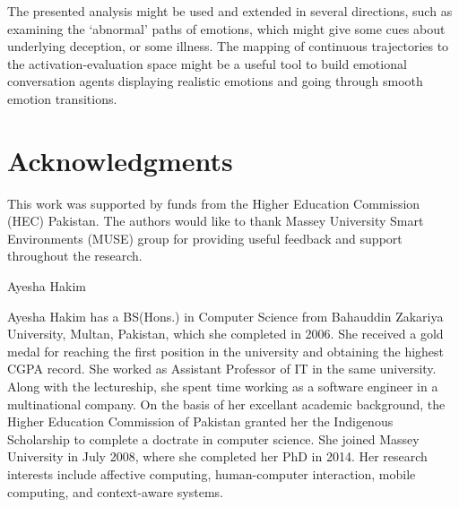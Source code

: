 \documentclass[10pt,journal,cspaper,compsoc]{IEEEtran}
\begin{document}
The presented analysis might be used and extended in several directions, such as examining the `abnormal' paths of emotions, which might give some cues about underlying deception, or some illness. The mapping of continuous trajectories to the activation-evaluation space might be a useful tool to build emotional conversation agents displaying realistic emotions and going through smooth emotion transitions.


\section*{Acknowledgments}
This work was supported by funds from the Higher Education Commission (HEC) Pakistan. The authors would like to thank Massey University Smart Environments (MUSE) group for providing useful feedback and support throughout the research.


\ifCLASSOPTIONcaptionsoff
  \newpage
\fi




 

\begin{biography}{Ayesha Hakim}

Ayesha Hakim has a BS(Hons.) in Computer Science from Bahauddin Zakariya University, Multan, Pakistan, which she completed in 2006. She received a gold medal for reaching the first position in the university and obtaining the highest CGPA record. She worked as Assistant Professor of IT in the same university. Along with the lectureship, she spent time working as a software engineer in a multinational company. On the basis of her excellant academic background, the Higher Education Commission of Pakistan granted her the Indigenous Scholarship to complete a doctrate in computer science. She joined Massey University in July 2008, where she completed her PhD in 2014. Her research interests include affective computing, human-computer interaction, mobile computing, and context-aware systems.
\end{biography}
\end{document}

